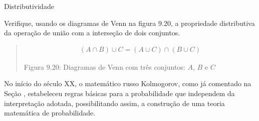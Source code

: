 \begin{task}{Distributividade}
\label{ativ-distributividade}

Verifique, usando os diagramas de Venn na figura 9.20, a propriedade distributiva da operação de união com a interseção de dois conjuntos.
\begin{quote}
\begin{equation*}
\begin{split}(A\cap B)\cup C=(A\cup C)\cap (B\cup C)\end{split}
\end{equation*}\begin{center}\end{center}\begin{center}\end{center}
Figura 9.20: Diagramas de Venn com três conjuntos: \(A\), \(B\)  e \(C\)
\end{quote}
\begin{quote}

\end{quote}
\end{task}

\label{\detokenize{PE511-3:explorando-probabilidade-regras-basicas-e-propriedades}}\label{\detokenize{PE511-3:sec-regras-basicas}}\label{\detokenize{PE511-3::doc}}
No início do século XX, o matemático russo Kolmogorov, como já comentado na Seção {\hyperref[\detokenize{PE511-0:sec-conceitos-basicos}]{}}, estabeleceu regras básicas para a probabilidade que independem da interpretação adotada, possibilitando assim, a construção de uma teoria matemática de probabilidade.

